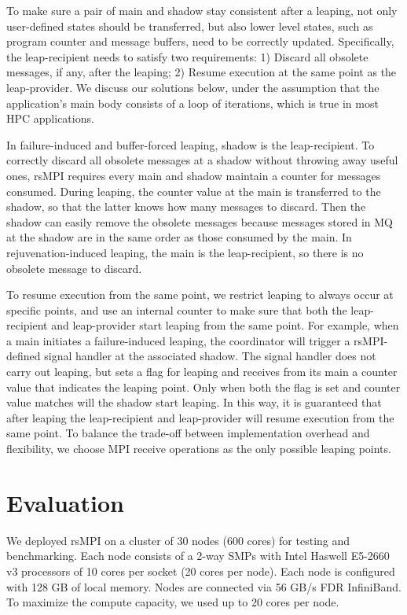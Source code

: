 To make sure a pair of main and shadow stay consistent after a leaping, not only user-defined states should be transferred, but also lower level states, such as program counter and message buffers, need to be correctly updated. Specifically, the leap-recipient needs to satisfy two requirements:  
1) Discard all obsolete messages, if any, after the leaping; 2) Resume execution at the same point as the leap-provider. We discuss our solutions below, under the assumption that the application's main body consists of a loop of iterations, which is true in most HPC applications.

In failure-induced and buffer-forced leaping, shadow is the leap-recipient. 
To correctly discard all obsolete messages at a shadow without throwing away useful ones, rsMPI requires every main and shadow maintain a counter for messages consumed. During leaping, the counter value at the main is transferred to the shadow, so that the latter knows how many messages to discard. Then the shadow can easily remove the obsolete messages because messages stored in MQ at the shadow are in the same order as those consumed by the main. In rejuvenation-induced leaping, the main is the leap-recipient, so there is no obsolete message to discard. 


To resume execution from the same point, we restrict leaping to always occur at specific points, and use an internal counter to make sure that both the leap-recipient and leap-provider start leaping from the same point. For example, when a main initiates a failure-induced leaping, the coordinator will trigger a rsMPI-defined signal handler at the associated shadow. The signal handler does not carry out leaping, but sets a flag for leaping and receives from its main a counter value that indicates the leaping point. %
Only when both the flag is set and counter value matches will the shadow start leaping. In this way, it is guaranteed that after leaping the leap-recipient and leap-provider will resume execution from the same point. To balance the trade-off between implementation overhead and flexibility, we choose MPI receive operations as the only possible leaping points. 

\section{Evaluation}
We deployed rsMPI on a cluster of 30 nodes (600 cores) for testing and benchmarking. Each node consists of a 2-way SMPs with Intel Haswell E5-2660 v3 processors of 10 cores per socket (20 cores per node). Each node is configured with 128 GB of local memory. Nodes are connected via 56 GB/s FDR InfiniBand. To maximize the compute capacity, we used up to 20 cores per node.

